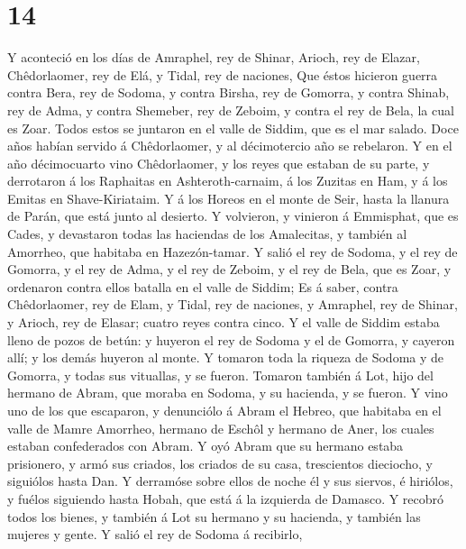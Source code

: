 \hypertarget{section-13}{%
\section{14}\label{section-13}}

 Y aconteció en los días de Amraphel, rey de Shinar, Arioch,
rey de Elazar, Chêdorlaomer, rey de Elá, y Tidal, rey de naciones,
 Que éstos hicieron guerra contra Bera, rey de Sodoma, y
contra Birsha, rey de Gomorra, y contra Shinab, rey de Adma, y contra
Shemeber, rey de Zeboim, y contra el rey de Bela, la cual es Zoar.
 Todos estos se juntaron en el valle de Siddim, que es el
mar salado.  Doce años habían servido á Chêdorlaomer, y al
décimotercio año se rebelaron.  Y en el año décimocuarto
vino Chêdorlaomer, y los reyes que estaban de su parte, y derrotaron á
los Raphaitas en Ashteroth-carnaim, á los Zuzitas en Ham, y á los Emitas
en Shave-Kiriataim.  Y á los Horeos en el monte de Seir,
hasta la llanura de Parán, que está junto al desierto.  Y
volvieron, y vinieron á Emmisphat, que es Cades, y devastaron todas las
haciendas de los Amalecitas, y también al Amorrheo, que habitaba en
Hazezón-tamar.  Y salió el rey de Sodoma, y el rey de
Gomorra, y el rey de Adma, y el rey de Zeboim, y el rey de Bela, que es
Zoar, y ordenaron contra ellos batalla en el valle de Siddim;
 Es á saber, contra Chêdorlaomer, rey de Elam, y Tidal, rey
de naciones, y Amraphel, rey de Shinar, y Arioch, rey de Elasar; cuatro
reyes contra cinco.  Y el valle de Siddim estaba lleno de
pozos de betún: y huyeron el rey de Sodoma y el de Gomorra, y cayeron
allí; y los demás huyeron al monte.  Y tomaron toda la
riqueza de Sodoma y de Gomorra, y todas sus vituallas, y se fueron.
 Tomaron también á Lot, hijo del hermano de Abram, que
moraba en Sodoma, y su hacienda, y se fueron.  Y vino uno
de los que escaparon, y denunciólo á Abram el Hebreo, que habitaba en el
valle de Mamre Amorrheo, hermano de Eschôl y hermano de Aner, los cuales
estaban confederados con Abram.  Y oyó Abram que su hermano
estaba prisionero, y armó sus criados, los criados de su casa,
trescientos dieciocho, y siguiólos hasta Dan.  Y derramóse
sobre ellos de noche él y sus siervos, é hiriólos, y fuélos siguiendo
hasta Hobah, que está á la izquierda de Damasco.  Y recobró
todos los bienes, y también á Lot su hermano y su hacienda, y también
las mujeres y gente.  Y salió el rey de Sodoma á recibirlo,

